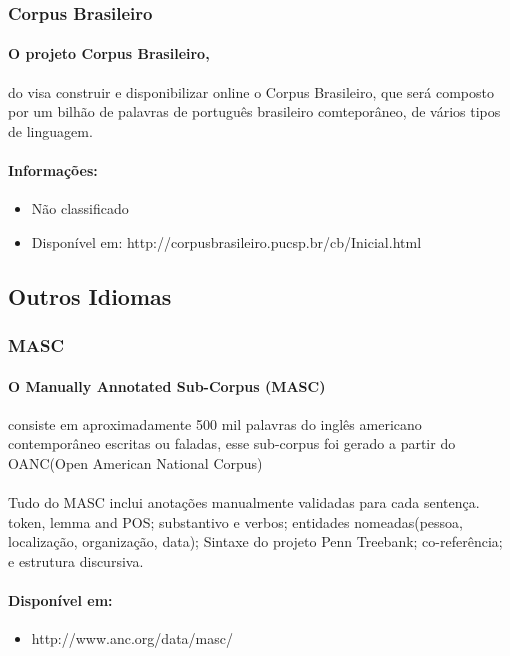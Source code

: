 \documentclass[a4paper, 10pt]{article}
\begin{document}
            \subsubsection{Corpus Brasileiro}
                \paragraph{O projeto Corpus Brasileiro,}
                do visa construir e disponibilizar online o Corpus Brasileiro, que será composto por um bilhão de palavras de português brasileiro comteporâneo, de vários tipos de linguagem.
                \paragraph{Informações:}
            	\begin{itemize}
            	    \item Não classificado
				    \item Disponível em: http://corpusbrasileiro.pucsp.br/cb/Inicial.html
			    \end{itemize}
        \subsection{Outros Idiomas}
        	\subsubsection{MASC}
            	\paragraph{O Manually Annotated Sub-Corpus (MASC)}
            	consiste em aproximadamente 500 mil palavras do inglês americano contemporâneo escritas ou faladas, esse sub-corpus foi gerado a partir do OANC(Open American National Corpus)
                \paragraph{}
                Tudo do MASC inclui anotações manualmente validadas para cada sentença. token, lemma and POS; substantivo e verbos; entidades nomeadas(pessoa, localização, organização, data); Sintaxe do projeto Penn Treebank; co-referência; e estrutura discursiva.
                
                \paragraph{Disponível em:}
                \begin{itemize}
                    \item http://www.anc.org/data/masc/
                \end{itemize}
\end{document}
